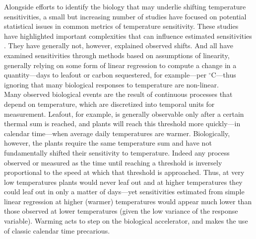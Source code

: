 \documentclass[11pt,letter]{article}
\begin{document}
Alongside efforts to identify the biology that may underlie shifting temperature sensitivities, a small but increasing number of studies have focused on potential statistical issues in common metrics of temperature sensitivity. These studies have highlighted important complexities that can influence estimated sensitivities \citep{clark2014a,gusewell2017,keenan2019}. They have generally not, however, explained observed shifts. And all have examined sensitivities through methods based on assumptions of linearity, generally relying on some form of linear regression to compute a change in a quantity---days to leafout or carbon sequestered, for example---per $^{\circ}$C---thus ignoring that many biological responses to temperature are non-linear. \\ %

Many observed biological events are the result of continuous processes that depend on temperature, which are discretized into temporal units for measurement. Leafout, for example, is generally observable only after a certain thermal sum is reached, and plants will reach this threshold more quickly---in calendar time---when average daily temperatures are warmer. Biologically, however, the plants require the same temperature sum and have not fundamentally shifted their sensitivity to temperature. Indeed any process observed or measured as the time until reaching a threshold is inversely proportional to the speed at which that threshold is approached. Thus, at very low temperatures plants would never leaf out and at higher temperatures they could leaf out in only a matter of days---yet sensitivities estimated from simple linear regression at higher (warmer) temperatures would appear much lower than those observed at lower temperatures (given the low variance of the response variable). Warming acts to step on the biological accelerator, and makes the use of classic calendar time precarious. \\
\end{document}
